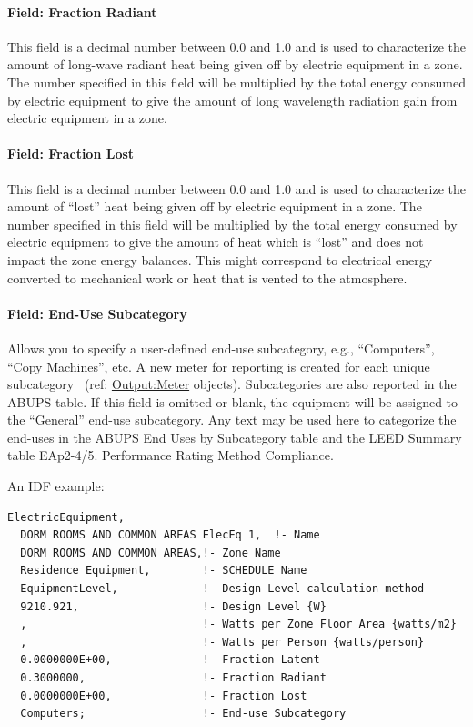 \paragraph{Field: Fraction Radiant}\label{field-fraction-radiant-2}

This field is a decimal number between 0.0 and 1.0 and is used to characterize the amount of long-wave radiant heat being given off by electric equipment in a zone. The number specified in this field will be multiplied by the total energy consumed by electric equipment to give the amount of long wavelength radiation gain from electric equipment in a zone.

\paragraph{Field: Fraction Lost}\label{field-fraction-lost}

This field is a decimal number between 0.0 and 1.0 and is used to characterize the amount of ``lost'' heat being given off by electric equipment in a zone. The number specified in this field will be multiplied by the total energy consumed by electric equipment to give the amount of heat which is ``lost'' and does not impact the zone energy balances. This might correspond to electrical energy converted to mechanical work or heat that is vented to the atmosphere.

\paragraph{Field: End-Use Subcategory}\label{field-end-use-subcategory-1-001}

Allows you to specify a user-defined end-use subcategory, e.g., ``Computers'', ``Copy Machines'', etc. A new meter for reporting is created for each unique subcategory~ (ref: \hyperref[outputmeter-and-outputmetermeterfileonly]{Output:Meter} objects). Subcategories are also reported in the ABUPS table. If this field is omitted or blank, the equipment will be assigned to the ``General'' end-use subcategory. Any text may be used here to categorize the end-uses in the ABUPS End Uses by Subcategory table and the LEED Summary table EAp2-4/5. Performance Rating Method Compliance.


An IDF example:

\begin{lstlisting}
ElectricEquipment,
  DORM ROOMS AND COMMON AREAS ElecEq 1,  !- Name
  DORM ROOMS AND COMMON AREAS,!- Zone Name
  Residence Equipment,        !- SCHEDULE Name
  EquipmentLevel,             !- Design Level calculation method
  9210.921,                   !- Design Level {W}
  ,                           !- Watts per Zone Floor Area {watts/m2}
  ,                           !- Watts per Person {watts/person}
  0.0000000E+00,              !- Fraction Latent
  0.3000000,                  !- Fraction Radiant
  0.0000000E+00,              !- Fraction Lost
  Computers;                  !- End-use Subcategory
\end{lstlisting}


